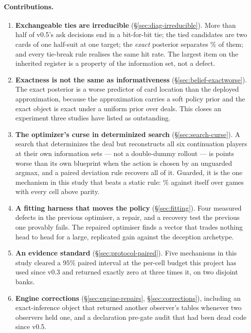 \paragraph{Contributions.}
\begin{enumerate}
\item \textbf{Exchangeable ties are irreducible} (\S\ref{sec:diag-irreducible}). More than half of
  v0.5's ask decisions end in a bit-for-bit tie; the tied candidates are two cards of one half-suit
  at one target; the \emph{exact} posterior separates \vsixTieExactSepPctFive\% of them; and every
  tie-break rule realises the same hit rate. The largest item on the inherited register is a
  property of the information set, not a defect.
\item \textbf{Exactness is not the same as informativeness} (\S\ref{sec:belief-exactworse}). The
  exact posterior is a worse predictor of card location than the deployed approximation, because
  the approximation carries a soft policy prior and the exact object is exact under a uniform prior
  over deals. This closes an experiment three studies have listed as outstanding.
\item \textbf{The optimizer's curse in determinized search} (\S\ref{sec:search-curse}). A search
  that determinizes the deal but reconstructs all six continuation players at their own information
  sets --- not a double-dummy rollout --- is \vsixCurseGap{} points worse than its own blueprint
  when the action is chosen by an unguarded argmax, and a paired deviation rule recovers all of it.
  Guarded, it is the one mechanism in this study that beats a static rule: \vsixSearchLift\% against
  \vsix{} itself over \vsixSearchLiftN{} games with every cell above parity.
\item \textbf{A fitting harness that moves the policy} (\S\ref{sec:fitting}). Four measured defects
  in the previous optimiser, a repair, and a recovery test the previous one provably fails. The
  repaired optimiser finds a vector that trades nothing head to head for a large, replicated gain
  against the deception archetype.
\item \textbf{An evidence standard} (\S\ref{sec:protocol-paired}). Five mechanisms in this study
  cleared a $95\%$ paired interval at the per-cell budget this project has used since v0.3 and
  returned exactly zero at three times it, on two disjoint banks.
\item \textbf{Engine corrections} (\S\ref{sec:engine-repairs}, \S\ref{sec:corrections}), including
  an exact-inference object that returned another observer's tables whenever two observers held one,
  and a declaration pre-gate audit that had been dead code since v0.5.
\end{enumerate}

